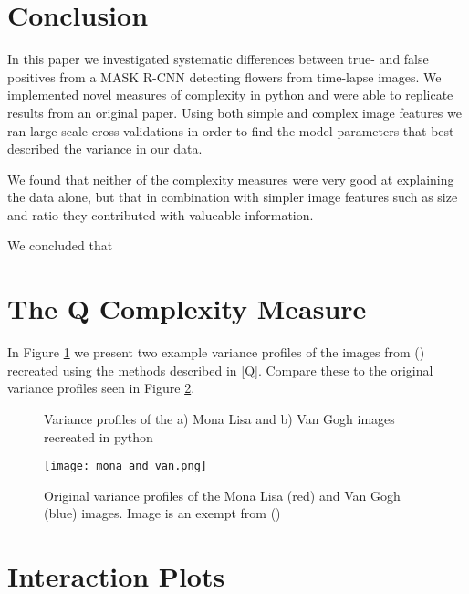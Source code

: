 \documentclass[12pt]{article}
\begin{document}
\section{Conclusion}
In this paper we investigated systematic differences between true- and false positives from a MASK R-CNN detecting flowers from time-lapse images. We implemented novel measures of complexity in python and were able to replicate results from an original paper. Using both simple and complex image features we ran large scale cross validations in order to find the model parameters that best described the variance in our data. 

We found that neither of the complexity measures were very good at explaining the data alone, but that in combination with simpler image features such as size and ratio they contributed with valueable information.

We concluded that 


\clearpage
\appto{\bibsetup}{\raggedright}
\printbibliography
\clearpage

\appendix
\section{The Q Complexity Measure}\label{AQ}
In Figure \ref{fig:Qrecreated} we present two example variance profiles of the images from (\cite{zanetteQuantifyingComplexityBlackandwhite2018}) recreated using the methods described in \ref{Q}. Compare these to the original variance profiles seen in Figure \ref{fig:monalisa}.

\begin{figure}[h]
	\centering
	\hfill
	\caption{Variance profiles of the a) Mona Lisa and b) Van Gogh images recreated in python} 
	\label{fig:Qrecreated}
\end{figure}

\begin{figure}[h]
	\begin{center}
		\texttt{[image: mona\_and\_van.png]}
	\end{center}
	\caption{Original variance profiles of the Mona Lisa (red) and Van Gogh (blue) images. Image is an exempt from (\cite{zanetteQuantifyingComplexityBlackandwhite2018})}
	\label{fig:monalisa}
\end{figure}

\clearpage
\section{Interaction Plots}\label{Ainteraction}
\end{document}
